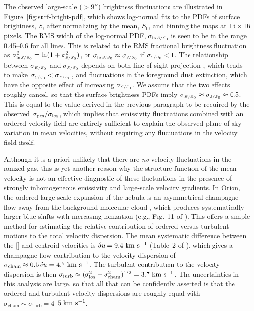 \documentclass[useAMS,usenatbib]{mn2e}
\begin{document}
The observed large-scale (\(> 9''\)) brightness fluctuations are
illustrated in Figure~\ref{fig:surf-bright-pdf}, which shows
log-normal fits to the PDFs of surface brightness, \(S\), after
normalizing by the mean, \(S_0\), and binning the maps at
\(16 \times 16\) pixels.  The RMS width of the log-normal PDF,
\(\sigma_{\scriptscriptstyle \ln S/S_0}\) is seen to be in the range 0.45--0.6 for all lines.
This is related to the RMS fractional brightness fluctuation as
\(\sigma^2_{\scriptscriptstyle \ln S/S_0} = \ln(1 + \sigma^2_{\scriptscriptstyle S/S_0})\), or
\(\sigma_{\scriptscriptstyle \ln S/S_0} \approx \sigma_{\scriptscriptstyle S/S_0}\) if \(\sigma_{\scriptscriptstyle S/S_0} < 1\).  The
relationship between \(\sigma_{\scriptscriptstyle E/E_0}\) and \(\sigma_{\scriptscriptstyle S/S_0}\) depends on
both line-of-sight projection \citep{Brunt:2010b}, which tends to make
\(\sigma_{\scriptscriptstyle S/S_0} < \sigma_{\scriptscriptstyle E/E_0}\), and fluctuations in the foreground
dust extinction, which have the opposite effect of increasing
\(\sigma_{\scriptscriptstyle S/S_0}\).  We assume that the two effects roughly cancel, so
that the surface brightness PDFs imply
\(\sigma_{\scriptscriptstyle E/E_0} \approx \sigma_{\scriptscriptstyle S/S_0} \approx 0.5\).  This is equal to
the value derived in the previous paragraph to be required by the
observed \(\sigma_{\mathrm{pos}}/\sigma_{\mathrm{los}}\), which implies that emissivity
fluctuations combined with an ordered velocity field are entirely
sufficient to explain the observed plane-of-sky variation in mean
velocities, without requiring any fluctuations in the velocity field
itself.

\newcommand\champ{\ensuremath{_{\mathrm{cham}}}}
\newcommand\turb{\ensuremath{_{\mathrm{turb}}}}
\newcommand\oi{[\ion{O}{1}]}
Although it is a priori unlikely that there are \textit{no} velocity
fluctuations in the ionized gas, this is yet another reason why the
structure function of the mean velocity is not an effective diagnostic
of these fluctuations in the presence of strongly inhomogeneous
emissivity and large-scale velocity gradients.  In Orion, the ordered
large scale expansion of the nebula is an asymmetrical champagne flow
away from the background molecular cloud \citep{Zuckerman:1973a}, which
produces systematically larger blue-shifts with increasing ionization
(e.g., Fig.~11 of \citealp{Baldwin:2000a}).  This offers a simple
method for estimating the relative contribution of ordered versus
turbulent motions to the total velocity dispersion.  The mean
systematic difference between the \oi{} and \oiii{} centroid
velocities is \(\delta u = 9.4~\mathrm{km\ s^{-1}}\) (Table~2 of
\citealp{Garcia-Diaz:2008a}), which gives a champagne-flow
contribution to the velocity dispersion of \(\sigma\champ \approx 0.5\,
\delta u = 4.7~\kms\).   The turbulent contribution to the velocity
dispersion is then \(\sigma\turb \approx (\sigma\los^2 -
\sigma\champ^2)^{1/2} = 3.7~\kms\).  The uncertainties in this
analysis are large, so that all that can be confidently asserted is
that the ordered and turbulent velocity dispersions are roughly equal
with \(\sigma\champ \sim \sigma\turb = 4\)--\(5~\mathrm{km\ s^{-1}}\).
\end{document}
